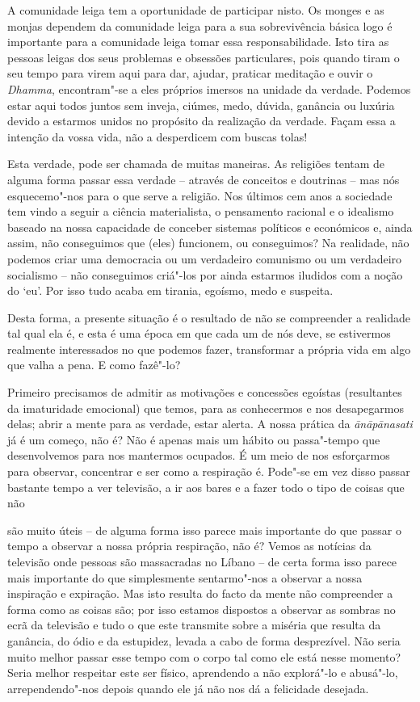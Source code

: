 A comunidade leiga tem a oportunidade de participar nisto. Os monges e
as monjas dependem da comunidade leiga para a sua sobrevivência básica
logo é importante para a comunidade leiga tomar essa responsabilidade.
Isto tira as pessoas leigas dos seus problemas e obsessões particulares,
pois quando tiram o seu tempo para virem aqui para dar, ajudar, praticar
meditação e ouvir o \emph{Dhamma}, encontram"-se a eles próprios imersos
na unidade da verdade. Podemos estar aqui todos juntos sem inveja,
ciúmes, medo, dúvida, ganância ou luxúria devido a estarmos unidos no
propósito da realização da verdade. Façam essa a intenção da vossa vida,
não a desperdicem com buscas tolas!

Esta verdade, pode ser chamada de muitas maneiras. As religiões tentam
de alguma forma passar essa verdade -- através de conceitos e doutrinas
-- mas nós esquecemo"-nos para o que serve a religião. Nos últimos cem
anos a sociedade tem vindo a seguir a ciência materialista, o pensamento
racional e o idealismo baseado na nossa capacidade de conceber sistemas
políticos e económicos e, ainda assim, não conseguimos que (eles)
funcionem, ou conseguimos? Na realidade, não podemos criar uma democracia
ou um verdadeiro comunismo ou um verdadeiro socialismo -- não
conseguimos criá"-los por ainda estarmos iludidos com a noção do `eu'.
Por isso tudo acaba em tirania, egoísmo, medo e suspeita.

Desta forma, a presente situação é o resultado de não se compreender a
realidade tal qual ela é, e esta é uma época em que cada um de nós deve,
se estivermos realmente interessados no que podemos fazer, transformar a
própria vida em algo que valha a pena. E como fazê"-lo?

Primeiro precisamos de admitir as motivações e concessões egoístas
(resultantes da imaturidade emocional) que temos, para as conhecermos e
nos desapegarmos delas; abrir a mente para as verdade, estar alerta. A
nossa prática da \emph{ānāpānasati} já é um começo, não é? Não é apenas
mais um hábito ou passa"-tempo que desenvolvemos para nos mantermos
ocupados. É um meio de nos esforçarmos para observar, concentrar e ser
como a respiração é. Pode"-se em vez disso passar bastante tempo a ver
televisão, a ir aos bares e a fazer todo o tipo de coisas que não

são muito úteis -- de alguma forma isso parece mais importante do que
passar o tempo a observar a nossa própria respiração, não é? Vemos as
notícias da televisão onde pessoas são massacradas no Líbano -- de certa
forma isso parece mais importante do que simplesmente sentarmo"-nos a
observar a nossa inspiração e expiração. Mas isto resulta do facto da
mente não compreender a forma como as coisas são; por isso estamos
dispostos a observar as sombras no ecrã da televisão e tudo o que este
transmite sobre a miséria que resulta da ganância, do ódio e da
estupidez, levada a cabo de forma desprezível. Não seria muito melhor
passar esse tempo com o corpo tal como ele está nesse momento? Seria
melhor respeitar este ser físico, aprendendo a não explorá"-lo e
abusá"-lo, arrependendo"-nos depois quando ele já não nos dá a felicidade
desejada.

